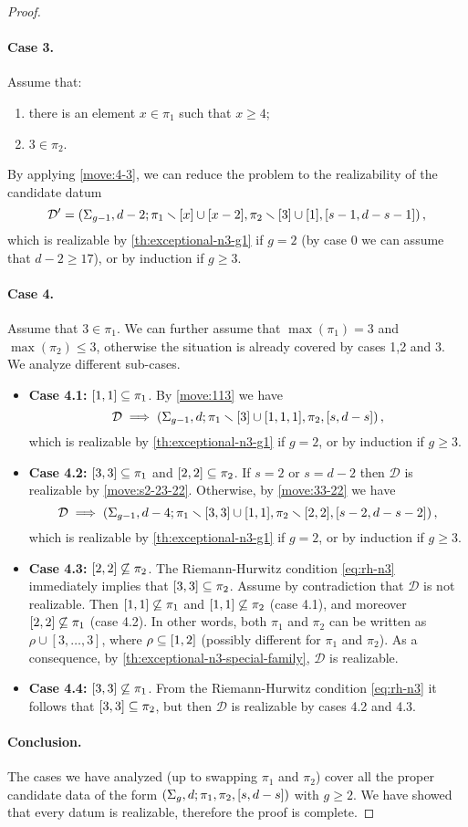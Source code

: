 \documentclass{article}
\begin{document}
\begin{proof}
\paragraph{Case 3.} Assume that:
\begin{enumerate}
\item there is an element $x\in\pi_1$ such that $x\ge 4$;
\item $3\in\pi_2$.
\end{enumerate}
By applying \cref{move:4-3}, we can reduce the problem to the realizability of the candidate datum
\[
\mathcal{D}'=\left(\Sigma_{g-1},d-2;\pi_1\smallsetminus[x]\cup[x-2],\pi_2\smallsetminus[3]\cup[1],[s-1,d-s-1]\right),
\]
which is realizable by \cref{th:exceptional-n3-g1} if $g=2$ (by case 0 we can assume that $d-2\ge 17$), or by induction if $g\ge 3$.

\paragraph{Case 4.} Assume that $3\in\pi_1$. We can further assume that $\max(\pi_1)=3$ and $\max(\pi_2)\le 3$, otherwise the situation is already covered by cases 1,2 and 3. We analyze different sub-cases.
\begin{itemize}[\phantom{}]
\item \textbf{Case 4.1:} $[1,1]\subseteq\pi_1$. By \cref{move:113} we have
\[
\mathcal{D}\implies\left(\Sigma_{g-1},d;\pi_1\smallsetminus[3]\cup[1,1,1],\pi_2,[s,d-s]\right),
\]
which is realizable by \cref{th:exceptional-n3-g1} if $g=2$, or by induction if $g\ge 3$.
\item \textbf{Case 4.2:} $[3,3]\subseteq\pi_1$ and $[2,2]\subseteq\pi_2$. If $s=2$ or $s=d-2$ then $\mathcal{D}$ is realizable by \cref{move:s2-23-22}. Otherwise, by \cref{move:33-22} we have
\[
\mathcal{D}\implies\left(\Sigma_{g-1},d-4;\pi_1\smallsetminus[3,3]\cup[1,1],\pi_2\smallsetminus[2,2],[s-2,d-s-2]\right),
\]
which is realizable by \cref{th:exceptional-n3-g1} if $g=2$, or by induction if $g\ge 3$.
\item \textbf{Case 4.3:} $[2,2]\not\subseteq\pi_2$. The Riemann-Hurwitz condition \eqref{eq:rh-n3} immediately implies that $[3,3]\subseteq\pi_2$. Assume by contradiction that $\mathcal{D}$ is not realizable. Then $[1,1]\not\subseteq\pi_1$ and $[1,1]\not\subseteq\pi_2$ (case 4.1), and moreover $[2,2]\not\subseteq\pi_1$ (case 4.2). In other words, both $\pi_1$ and $\pi_2$ can be written as $\rho\cup[3,\ldots,3]$, where $\rho\subseteq[1,2]$ (possibly different for $\pi_1$ and $\pi_2$). As a consequence, by \cref{th:exceptional-n3-special-family}, $\mathcal{D}$ is realizable.
\item \textbf{Case 4.4:} $[3,3]\not\subseteq\pi_1$. From the Riemann-Hurwitz condition \eqref{eq:rh-n3} it follows that $[3,3]\subseteq\pi_2$, but then $\mathcal{D}$ is realizable by cases 4.2 and 4.3.
\end{itemize}

\paragraph{Conclusion.} The cases we have analyzed (up to swapping $\pi_1$ and $\pi_2$) cover all the proper candidate data of the form $\left(\Sigma_g,d;\pi_1,\pi_2,[s,d-s]\right)$ with $g\ge 2$. We have showed that every datum is realizable, therefore the proof is complete.
\end{proof}
\end{document}
